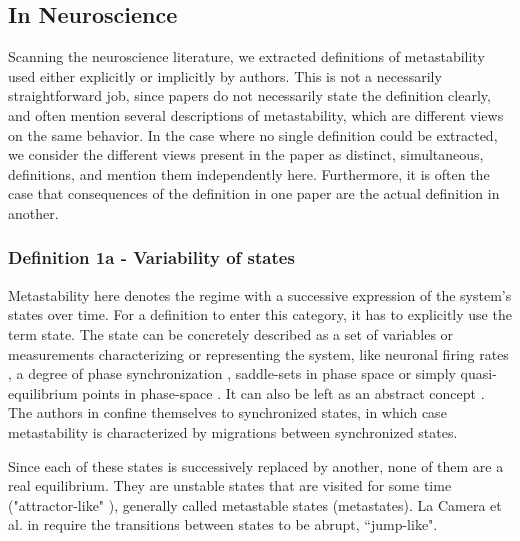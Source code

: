 \documentclass[preprint,superscriptaddress,showpacs,amsmath,amssymb,aps,pre,floatfix]{revtex4-1}
\theoremstyle{definition}
\begin{document}
\subsection{In Neuroscience}
Scanning the neuroscience literature, we extracted definitions of metastability used either explicitly or implicitly by authors. This is not a necessarily straightforward job, since papers do not necessarily state the definition clearly, and often mention several descriptions of metastability, which are different views on the same behavior. In the case where no single definition could be extracted, we consider the different views present in the paper as distinct, simultaneous, definitions, and mention them independently here. Furthermore, it is often the case that consequences of the definition in one paper are the actual definition in another.

\subsubsection{Definition 1a - Variability of states }
\label{sec:varstates}
Metastability here denotes the regime with a successive expression of the system's states over time. For a definition to enter this category, it has to explicitly use the term state.
The state can be concretely described as a set of variables or measurements characterizing or representing the system, like neuronal firing rates \cite{mazzucato_2015, lacamera_2019, afraimovich_2010}, a degree of phase synchronization \cite{alderson_2020, lee_2017, vasa_2015, hellyer_2014, naik_2017}, saddle-sets in phase space \cite{rabinovich_2008} or simply quasi-equilibrium points in phase-space \cite{cavanna_2018}. It can also be left as an abstract concept \cite{werner_2007}. The authors in \cite{bhowmik_2013, wildie_2012} confine themselves to synchronized states, in which case metastability is characterized by migrations between synchronized states. 

Since each of these states is successively replaced by another, none of them are a real equilibrium. They are unstable states that are visited for some time ("attractor-like" \cite{vasa_2015, hellyer_2014, shanahan_2010, wildie_2012}), generally called metastable states (metastates). La Camera et al. in \cite{lacamera_2019} require the transitions between states to be abrupt, ``jump-like".
\end{document}

